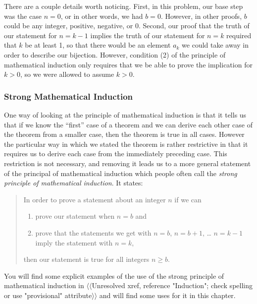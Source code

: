 \documentclass[10pt,]{book}
\theoremstyle{plain}
\theoremstyle{definition}
\numberwithin{equation}{chapter}
\begin{document}
\par
There are a couple details worth noticing. First, in this problem, our base step was the case \(n=0\), or in other words, we had \(b=0\). However, in other proofs, \(b\) could be any integer, positive, negative, or 0. Second, our proof that the truth of our statement for \(n=k-1\) implies the truth of our statement for \(n=k\) required that \(k\) be at least 1, so that there would be an element \(a_k\) we could take away in order to describe our bijection. However, condition (2) of the principle of mathematical induction only requires that we be able to prove the implication for \(k>0\), so we were allowed to assume \(k>0\).%
\typeout{************************************************}
\typeout{************************************************}
\subsubsection[{Strong Mathematical Induction}]{Strong Mathematical Induction}\label{subsubsection-1}
One way of looking at the principle of mathematical induction is that it tells us that if we know the ``first'' case of a theorem and we can derive each other case of the theorem from a smaller case, then the theorem is true in all cases. However the particular way in which we stated the theorem is rather restrictive in that it requires us to derive each case from the immediately preceding case. This restriction is not necessary, and removing it leads us to a more general statement of the principal of mathematical induction which people often call the \emph{strong principle of mathematical induction}. It states:%
\begin{quote}In order to prove a statement about an integer \(n\) if we can \leavevmode%
\begin{enumerate}
\item\hypertarget{li-15}{}prove our statement when \(n=b\) and%
\item\hypertarget{li-16}{}prove that the statements we get with \(n=b\), \(n=b+1\), \dots{} \(n=k-1\) imply the statement with \(n=k\),%
\end{enumerate}
 then our statement is true for all integers \(n\ge b\).\end{quote}
You will find some explicit examples of the use of the strong principle of mathematical induction in {$\langle\langle$Unresolved xref, reference "Induction"; check spelling or use "provisional" attribute$\rangle\rangle$} and will find some uses for it in this chapter.%
\typeout{************************************************}
\typeout{************************************************}
\end{document}
